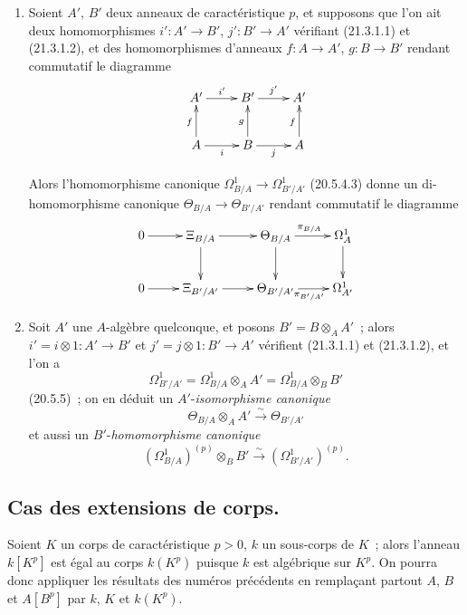 \begin{remarks}[21.3.6]
\label{0.21.3.6-fr}
\begin{enumerate}
  \item[(i)] Soient $A'$, $B'$ deux anneaux de caractéristique $p$, et
  supposons que l'on ait deux homomorphismes $i':A'\to B'$, $j':B'\to A'$ vérifiant
  (21.3.1.1) et (21.3.1.2), et des homomorphismes d'anneaux
  $f:A\to A'$, $g:B\to B'$ rendant commutatif le diagramme
  \[
  \xymatrix{
  A'\ar[r]^{i'}&B'\ar[r]^{j'}&A'\\
  A\ar[u]^f\ar[r]_i&B\ar[u]^g\ar[r]_j&A\ar[u]^f
  }
  \]

  Alors l'homomorphisme canonique $\Omega^1_{B/A}\to\Omega^1_{B'/A'}$
  (20.5.4.3) donne un di-homomorphisme canonique
  $\Theta_{B/A}\to\Theta_{B'/A'}$ rendant commutatif le diagramme
  \[
  \xymatrix{
  0\ar[r]&\Xi_{B/A}\ar[r]\ar[d]&\Theta_{B/A}\ar[r]^{\pi_{B/A}}\ar[d]&\Omega^1_A\ar[d]\\
  0\ar[r]&\Xi_{B'/A'}\ar[r]&\Theta_{B'/A'}\ar[r]_{\pi_{B'/A'}}&\Omega^1_{A'}
  }
  \]
  \item[(ii)] Soit $A'$ une $A$-algèbre quelconque, et posons
  $B'=B\otimes_A A'$~; alors $i'=i\otimes1:A'\to B'$ et
  $j'=j\otimes1:B'\to A'$ vérifient (21.3.1.1) et (21.3.1.2), et l'on a
  \[
  \Omega^1_{B'/A'}=\Omega^1_{B/A}\otimes_A A'=\Omega^1_{B/A}\otimes_B B'
  \]
  (20.5.5)~; on en déduit un $A'$-\emph{isomorphisme canonique}
  \begin{equation}
  \tag{21.3.6.1}\label{0.21.3.6.1-fr}
  \Theta_{B/A}\otimes_A A'\xrightarrow{\sim}\Theta_{B'/A'}
  \end{equation}
  et aussi un $B'$-\emph{homomorphisme canonique}
  \begin{equation}
  \tag{21.3.6.2}\label{0.21.3.6.2-fr}
  (\Omega^1_{B/A})^{(p)}\otimes_B B'\xrightarrow{\sim}
  (\Omega^1_{B'/A'})^{(p)}.
  \end{equation}
\end{enumerate}
\end{remarks}

\subsection{Cas des extensions de corps.}
\label{0.21.4-fr}

\begin{env}[21.4.0]
\label{0.21.4.0-fr}
Soient $K$ un corps de caractéristique $p>0$, $k$ un sous-corps de $K$~;
alors l'anneau $k[K^p]$ est égal au corps $k(K^p)$ puisque $k$ est algébrique
sur $K^p$. On pourra donc appliquer les résultats des numéros précédents en
remplaçant partout $A$, $B$ et $A[B^p]$ par $k$, $K$ et $k(K^p)$.
\end{env}

